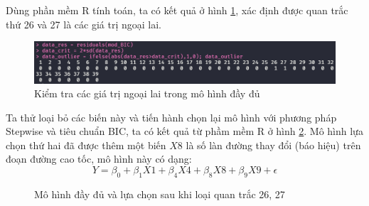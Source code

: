 Dùng phần mềm R tính toán, ta có kết quả ở hình \ref{fig-b3:dataset-outlier}, xác định được quan trắc thứ 26 và 27 là các giá trị ngoại lai.
\begin{figure}[H]
	\centering
	\includegraphics[width=0.7\linewidth]{images/B3/dataset-outlier}
	\caption{Kiểm tra các giá trị ngoại lai trong mô hình đầy đủ}
	\label{fig-b3:dataset-outlier}
\end{figure}

Ta thử loại bỏ các biến này và tiến hành chọn lại mô hình với phương pháp Stepwise và tiêu chuẩn BIC, ta có kết quả từ phầm mềm R ở hình \ref{fig-b3:new-models}. Mô hình lựa chọn thứ hai đã được thêm một biến $X8$ là số làn đường thay đổi (báo hiệu) trên đoạn đường cao tốc, mô hình này có dạng:
\begin{equation}\label{b3-new-model-bic}
	Y = \beta_0 + \beta_1X1 + \beta_4X4 + \beta_8X8 + \beta_9X9 + \epsilon
\end{equation}

\begin{figure}[H]
	\centering
	\hfill
	\caption{Mô hình đầy đủ và lựa chọn sau khi loại quan trắc 26, 27}
	\label{fig-b3:new-models}
\end{figure}

